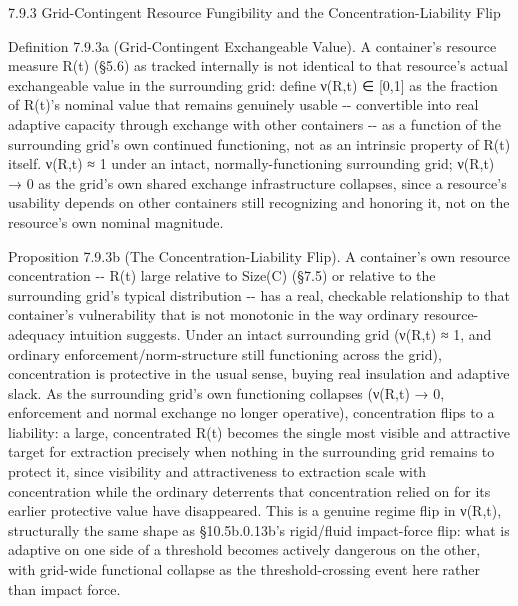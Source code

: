 \documentclass[
]{article}
\begin{document}
7.9.3 Grid-Contingent Resource Fungibility and the
Concentration-Liability Flip

Definition 7.9.3a (Grid-Contingent Exchangeable Value). A container's
resource measure R(t) (§5.6) as tracked internally is not identical to
that resource's actual exchangeable value in the surrounding grid:
define ν(R,t) ∈ {[}0,1{]} as the fraction of R(t)'s nominal value that
remains genuinely usable -\/- convertible into real adaptive capacity
through exchange with other containers -\/- as a function of the
surrounding grid's own continued functioning, not as an intrinsic
property of R(t) itself. ν(R,t) ≈ 1 under an intact,
normally-functioning surrounding grid; ν(R,t) → 0 as the grid's own
shared exchange infrastructure collapses, since a resource's usability
depends on other containers still recognizing and honoring it, not on
the resource's own nominal magnitude.

Proposition 7.9.3b (The Concentration-Liability Flip). A container's own
resource concentration -\/- R(t) large relative to Size(C) (§7.5) or
relative to the surrounding grid's typical distribution -\/- has a real,
checkable relationship to that container's vulnerability that is not
monotonic in the way ordinary resource-adequacy intuition suggests.
Under an intact surrounding grid (ν(R,t) ≈ 1, and ordinary
enforcement/norm-structure still functioning across the grid),
concentration is protective in the usual sense, buying real insulation
and adaptive slack. As the surrounding grid's own functioning collapses
(ν(R,t) → 0, enforcement and normal exchange no longer operative),
concentration flips to a liability: a large, concentrated R(t) becomes
the single most visible and attractive target for extraction precisely
when nothing in the surrounding grid remains to protect it, since
visibility and attractiveness to extraction scale with concentration
while the ordinary deterrents that concentration relied on for its
earlier protective value have disappeared. This is a genuine regime flip
in ν(R,t), structurally the same shape as §10.5b.0.13b's rigid/fluid
impact-force flip: what is adaptive on one side of a threshold becomes
actively dangerous on the other, with grid-wide functional collapse as
the threshold-crossing event here rather than impact force.
\end{document}
